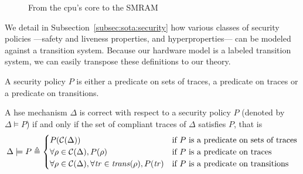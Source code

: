 \begin{figure}
  \centering

  \caption{From the \ac{cpu}'s core to the SMRAM}
  \label{fig:speccert:smram}
\end{figure}

We detail in Subsection~\ref{subsec:sota:security} how various classes of
security policies ---safety and liveness properties, and hyperproperties--- can
be modeled against a transition system.
%
Because our hardware model is a labeled transition system, we can easily
transpose these definitions to our theory.

\begin{definition}
  A security policy \( P \) is either a predicate on sets of traces, a predicate
  on traces or a predicate on transitions.
\end{definition}

\begin{definition}
  A \ac{hse} mechanism $\Delta$ is correct with respect to a security policy $P$
  (denoted by $\Delta \models P$) if and only if the set of compliant traces of
  $\Delta$ satisfies $P$, that is
  \[
    \Delta \models P \triangleq
    \begin{cases}
      P(\mathcal{C}(\Delta)) & \text{if } P \text{ is a predicate on sets of
        traces} \\
      \forall \rho \in \mathcal{C}(\Delta), P(\rho) & \text{if } P \text{ is a
        predicate on traces} \\
      \forall \rho \in \mathcal{C}(\Delta), \forall \mathit{tr} \in
      \mathit{trans}(\rho), P(\mathit{tr}) & \text{if }P \text{ is a predicate on
        transitions}
    \end{cases}
  \]
\end{definition}

